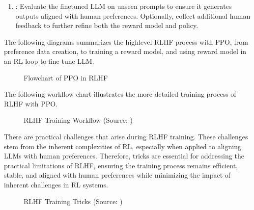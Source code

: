 \documentclass[letterpaper,11pt,english]{sphinxmanual}
\begin{document}
\begin{enumerate}
\begin{enumerate}
\end{enumerate}

\item {} 
\sphinxAtStartPar
{}: Evaluate the fine\sphinxhyphen{}tuned LLM on unseen prompts to
ensure it generates outputs aligned with human preferences.
Optionally, collect additional human feedback to further refine both
the reward model and policy.

\end{enumerate}

\sphinxAtStartPar
The following diagrams summarizes the high\sphinxhyphen{}level RLHF process with PPO,
from preference data creation, to training a reward model, and using
reward model in an RL loop to fine tune LLM.

\begin{figure}[htbp]
\centering
\capstart

\noindent{}
\caption{Flowchart of PPO in RLHF}\label{\detokenize{finetuning:id13}}\end{figure}

\sphinxAtStartPar
The following workflow chart illustrates the more detailed training
process of RLHF with PPO. 

\begin{figure}[htbp]
\centering
\capstart

\noindent{}
\caption{RLHF Training Workflow (Source: )}\label{\detokenize{finetuning:id14}}\end{figure}

\sphinxAtStartPar
{}

\sphinxAtStartPar
There are practical challenges that arise during RLHF training. These
challenges stem from the inherent complexities of RL, especially when
applied to aligning LLMs with human preferences. Therefore, tricks are
essential for addressing the practical limitations of RLHF, ensuring the
training process remains efficient, stable, and aligned with human
preferences while minimizing the impact of inherent challenges in RL
systems.

\begin{figure}[htbp]
\centering
\capstart

\noindent{}
\caption{RLHF Training Tricks (Source: )}\label{\detokenize{finetuning:id15}}\end{figure}
\end{document}
